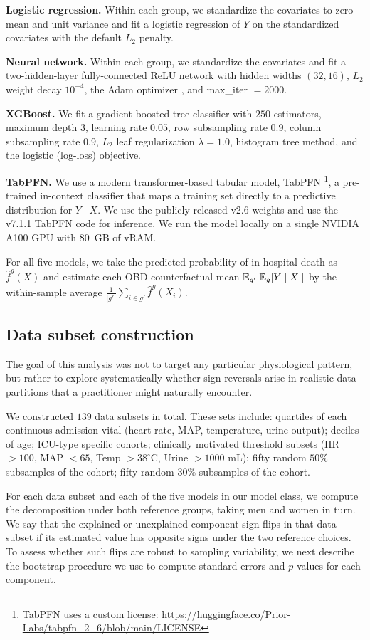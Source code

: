 \textbf{Logistic regression.} Within each group, we standardize the covariates to zero mean and unit variance and fit a logistic regression of $Y$ on the standardized covariates with the default $L_2$ penalty.

\textbf{Neural network.} Within each group, we standardize the covariates and fit a two-hidden-layer fully-connected ReLU network with hidden widths $(32, 16)$, $L_2$ weight decay $10^{-4}$, the Adam optimizer \citep{kingma2015adam}, and max\_iter $=2000$.

\textbf{XGBoost.} We fit a gradient-boosted tree classifier with $250$ estimators, maximum depth $3$, learning rate $0.05$, row subsampling rate $0.9$, column subsampling rate $0.9$, $L_2$ leaf regularization $\lambda = 1.0$, histogram tree method, and the logistic (log-loss) objective.

\textbf{TabPFN.} We use a modern transformer-based tabular model, TabPFN \citep{hollmann2023tabpfn}\footnote{TabPFN uses a custom license: \url{https://huggingface.co/Prior-Labs/tabpfn_2_6/blob/main/LICENSE}}, a pre-trained in-context classifier that maps a training set directly to a predictive distribution for $Y \mid X$. We use the publicly released v2.6 weights and use the v7.1.1 TabPFN code for inference. We run the model locally on a single NVIDIA A100 GPU with $80$~GB of vRAM.

For all five models, we take the predicted probability of in-hospital death as $\hat{f}^g(X)$ and estimate each OBD counterfactual mean $\mathbb{E}_{g'}[\mathbb{E}_g[Y \mid X]]$ by the within-sample average $\frac{1}{|g'|}\sum_{i \in g'} \hat{f}^g(X_i)$.

\subsection*{Data subset construction}
The goal of this analysis was not to target any particular physiological pattern, but rather to explore systematically whether sign reversals arise in realistic data partitions that a practitioner might naturally encounter.

We constructed $139$ data subsets in total. These sets include: quartiles of each continuous admission vital (heart rate, MAP, temperature, urine output);
deciles of age; ICU-type specific cohorts; clinically motivated threshold subsets (HR $>100$, MAP $<65$, Temp $> 38^\circ$C, Urine $>1000$ mL); fifty random $50\%$ subsamples of the cohort; fifty random $30\%$ subsamples of the cohort.

For each data subset and each of the five models in our model class, we compute the decomposition under both reference groups, taking men and women in turn. We say that the explained or unexplained component sign flips in that data subset if its estimated value has opposite signs under the two reference choices. To assess whether such flips are robust to sampling variability, we next describe the bootstrap procedure we use to compute standard errors and $p$-values for each component.

